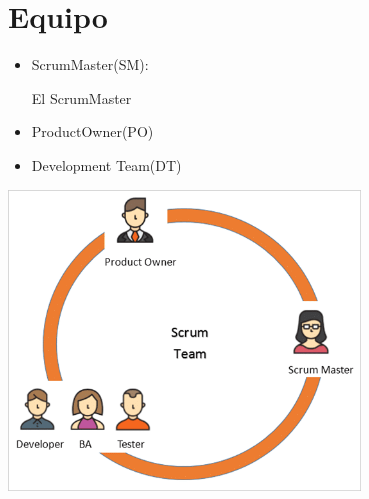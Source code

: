 
\chapter{Equipo}

\begin{itemize}
\item ScrumMaster(SM):

	El ScrumMaster  
\item ProductOwner(PO)
\item Development Team(DT)
\end{itemize}
	\centering
	\includegraphics[width=0.70\textwidth]{img/scrum_team}\par\vspace{1cm}

